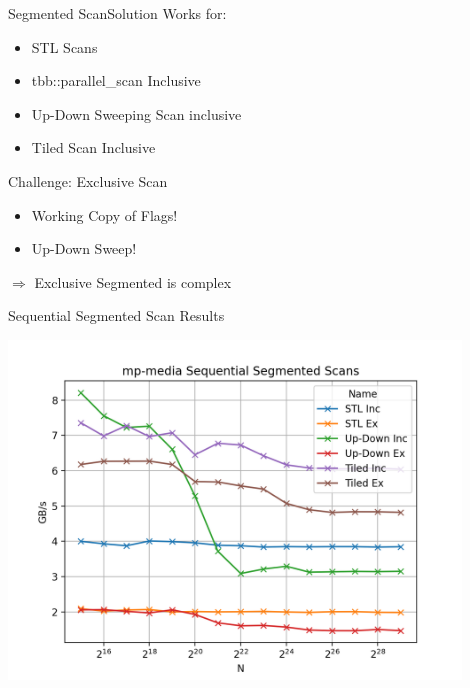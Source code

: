 \begin{frame}[fragile]{Segmented Scan}{Solution}
Works for:
\begin{itemize}
 \item STL Scans
 \item tbb::parallel\_scan Inclusive
 \item Up-Down Sweeping Scan inclusive
 \item Tiled Scan Inclusive
\end{itemize}
\vspace{10pt}
Challenge: Exclusive Scan
\begin{itemize}
 \item Working Copy of Flags!
 \item Up-Down Sweep!
\end{itemize}
$\Rightarrow$ Exclusive Segmented is complex

\end{frame}


\begin{frame}{Sequential Segmented Scan Results}
 
  \centering
  \vspace{-5pt}
  \includegraphics[width=0.90\textwidth]{"graphs/mp-media Sequential Segmented Scans"}
 
\end{frame}

